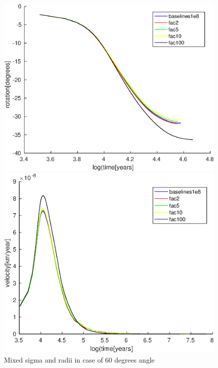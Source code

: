 \documentclass[12pt]{scrreprt}
\begin{document}
\begin{figure}[ht!]
	\begin{minipage}[t]{1.0\textwidth}	
		\begin{minipage}[t]{0.5\textwidth}
		\includegraphics[width=1.0\textwidth]{./Snapshots/slab60s1e8mixedsigma_rot.eps}
		\end{minipage}
		\begin{minipage}[t]{0.5\textwidth}
		\includegraphics[width=1.0\textwidth]{./Snapshots/slab60s1e8mixedsigma_vel.eps}
		\end{minipage}
	\end{minipage}
	\caption{Mixed sigma and radii in case of 60 degrees angle}
	\label{fig:mixsigma60}
\end{figure}
\end{document}
